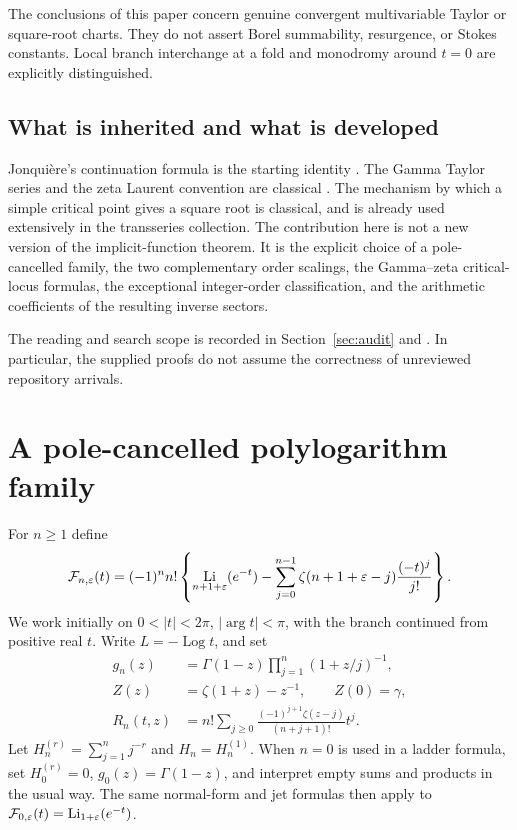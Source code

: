 \documentclass[11pt,a4paper]{article}
\numberwithin{equation}{section}
\theoremstyle{definition}\newtheorem{definition}[theorem]{Definition}
\theoremstyle{remark}\newtheorem{remark}[theorem]{Remark}
\DeclareMathOperator{\Li}{Li}
\DeclareMathOperator{\Log}{Log}
\newcommand{\F}{\mathcal F}\newcommand{\B}{\mathcal B}
\begin{document}
The conclusions of this paper concern genuine convergent multivariable
Taylor or square-root charts. They do not assert Borel summability,
resurgence, or Stokes constants. Local branch interchange at a fold and
monodromy around $t=0$ are explicitly distinguished.

\subsection{What is inherited and what is developed}
Jonqui\`ere's continuation formula is the starting identity
\cite[Eq.~25.12.12]{dlmf-poly}. The Gamma Taylor series and the zeta Laurent
convention are classical \cite{dlmf-gamma,dlmf-zeta}. The mechanism by which a
simple critical point gives a square root is classical, and is already
used extensively in the transseries collection. The contribution here is
not a new version of the implicit-function theorem. It is the explicit
choice of a pole-cancelled family, the two complementary order scalings,
the Gamma--zeta critical-locus formulas, the exceptional integer-order
classification, and the arithmetic coefficients of the resulting inverse
sectors.

The reading and search scope is recorded in Section~\ref{sec:audit} and
. In particular, the supplied proofs do not
assume the correctness of unreviewed repository arrivals.

\section{A pole-cancelled polylogarithm family}
\label{sec:normal}
For $n\ge1$ define
\begin{equation}\label{eq:Fdef}
 \F_{n,\eps}(t)=(-1)^n n!\left\{
 \Li_{n+1+\eps}(e^{-t})-
 \sum_{j=0}^{n-1}\zeta(n+1+\eps-j)\frac{(-t)^j}{j!}\right\}.
\end{equation}
We work initially on $0<|t|<2\pi$, $|\arg t|<\pi$, with the branch continued
from positive real $t$. Write $L=-\Log t$, and set
\begin{align}
 g_n(z)&=\Gamma(1-z)\prod_{j=1}^n(1+z/j)^{-1},\label{eq:gdef}\\
 Z(z)&=\zeta(1+z)-z^{-1},\qquad Z(0)=\gamma,\label{eq:Zdef}\\
 R_n(t,z)&=n!\sum_{j\ge0}
    \frac{(-1)^{j+1}\zeta(z-j)}{(n+j+1)!}t^j.\label{eq:Rdef}
\end{align}
Let $H_n^{(r)}=\sum_{j=1}^n j^{-r}$ and $H_n=H_n^{(1)}$.
When $n=0$ is used in a ladder formula, set $H_0^{(r)}=0$,
$g_0(z)=\Gamma(1-z)$, and interpret empty sums and products in the
usual way. The same normal-form and jet formulas then apply to
$\F_{0,\eps}(t)=\Li_{1+\eps}(e^{-t})$.
\end{document}
